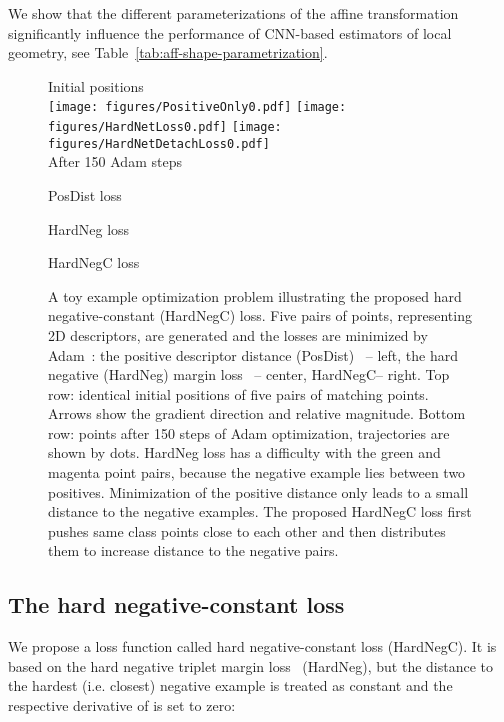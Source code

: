 \documentclass[runningheads]{llncs}
\begin{document}
We show that the different parameterizations of the affine transformation significantly influence the performance of CNN-based estimators of local geometry, see Table~\ref{tab:aff-shape-parametrization}.
 \begin{figure}[htb]\centering
 Initial positions\\
 \texttt{[image: figures/PositiveOnly0.pdf]}\hfill
 \texttt{[image: figures/HardNetLoss0.pdf]}\hfill
 \texttt{[image: figures/HardNetDetachLoss0.pdf]}\\
After 150 Adam steps\\
\begin{minipage}[h]{0.30\linewidth}
 PosDist loss\\
\end{minipage}
\hfill
\begin{minipage}[h]{0.30\linewidth}
 HardNeg loss\\
\end{minipage}
\hfill
\begin{minipage}[h]{0.30\linewidth}
 HardNegC loss\\
\end{minipage}
 \caption{A toy example optimization problem illustrating the proposed hard negative-constant (HardNegC) loss. Five pairs of points, representing 2D descriptors, are generated and the losses are minimized by Adam~\cite{Adam2014}: the positive descriptor distance (PosDist)~\cite{OriNet2016} -- left, the hard negative (HardNeg) margin loss~\cite{HardNet2017} -- center, HardNegC-- right. 
Top row: identical initial positions of five pairs of matching points. Arrows show the gradient direction and relative magnitude. 
Bottom row: points after 150 steps of Adam optimization, trajectories are shown by dots. HardNeg loss has a difficulty with the green and magenta point pairs, because the negative example lies between two positives. Minimization of the positive distance only leads to a small distance to the negative examples. The proposed HardNegC loss first pushes same class points close to each other and then distributes them to increase distance to the negative pairs.}
\label{fig:toy}
\end{figure}\subsection{The hard negative-constant loss}\label{sec:loss}
We propose a loss function called hard negative-constant loss (HardNegC). It is based on the hard negative triplet margin loss~\cite{HardNet2017} (HardNeg), but the distance to the hardest (i.e. closest) negative example is treated as constant and the respective derivative of   is set to zero:
\end{document}
